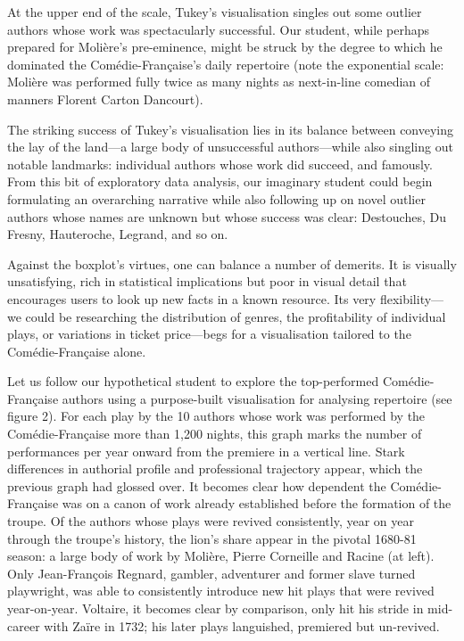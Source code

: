 \documentclass[	DIV=calc,%
							paper=a4,%
							fontsize=11pt,%
							twocolumn]{scrartcl}	 					%
\begin{document}
At the upper end of the scale, Tukey’s visualisation singles out some outlier authors whose work was spectacularly successful.  Our student, while perhaps prepared for Molière’s pre-eminence, might be struck by the degree to which he dominated the Comédie-Française’s daily repertoire (note the exponential scale: Molière was performed fully twice as many nights as next-in-line comedian of manners Florent Carton Dancourt).

The striking success of Tukey’s visualisation lies in its balance between conveying the lay of the land—a large body of unsuccessful authors—while also singling out notable landmarks: individual authors whose work did succeed, and famously.  From this bit of exploratory data analysis, our imaginary student could begin formulating an overarching narrative while also following up on novel outlier authors whose names are unknown but whose success was clear: Destouches, Du Fresny, Hauteroche, Legrand, and so on.

Against the boxplot’s virtues, one can balance a number of demerits.  It is visually unsatisfying, rich in statistical implications but poor in visual detail that encourages users to look up new facts in a known resource.  Its very flexibility—we could be researching the distribution of genres, the profitability of individual plays, or variations in ticket price—begs for a visualisation tailored to the Comédie-Française alone.

Let us follow our hypothetical student to explore the top-performed Comédie-Française authors using a purpose-built visualisation for analysing repertoire (see figure 2).  For each play by the 10 authors whose work was performed by the Comédie-Française more than 1,200 nights, this graph marks the number of performances per year onward from the premiere in a vertical line.  Stark differences in authorial profile and professional trajectory appear, which the previous graph had glossed over.  It becomes clear how dependent the Comédie-Française was on a canon of work already established before the formation of the troupe.  Of the authors whose plays were revived consistently, year on year through the troupe’s history, the lion’s share appear in the pivotal 1680-81 season: a large body of work by Molière, Pierre Corneille and Racine (at left).  Only Jean-François Regnard, gambler, adventurer and former slave turned playwright, was able to consistently introduce new hit plays that were revived year-on-year.  Voltaire, it becomes clear by comparison, only hit his stride in mid-career with Zaïre in 1732; his later plays languished, premiered but un-revived.
\end{document}
